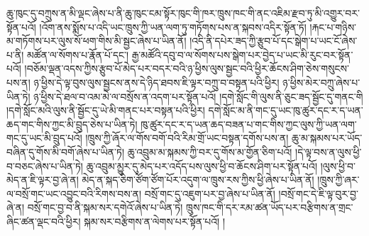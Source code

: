 ཆུ་ཁུང་དུ་བཀྲུས་ན་མི་ལྡང་ཞེས་པ་ནི་ཆུ་ཁུང་ངམ་སྟོར་ཁུང་གི་ཁར་ཁྲུས་ཁང་གི་ནང་འཇིམ་རྫབ་ཏུ་མི་འགྱུར་བར་སྟོན་པའོ། །འོག་ནས་སྨོས་པ་འདི་ཡང་ཁྲུས་ཀྱི་ཡན་ལག་ཏུ་གཏོགས་པས་ན་སྐབས་འདིར་སྟོན་ཏོ། །རྐང་པ་གཉིས་མ་གཏོགས་པར་ལུས་སོ་ཕག་གིས་མི་སྦྱང་ཞེས་པ་ཡིན་ནོ། །འདི་ནི་དཔེར་ཟད་ཀྱི་རྩུབ་པོ་དང་སྒེག་པ་ཡང་ངོ་ཞེས་པ་ནི། མཚོན་ལ་སོགས་པ་རྣོན་པོ་དང་། རྒྱ་མཚོའི་དབུ་བ་ལ་སོགས་པས་སྒེག་པར་བྱེད་པ་ཡང་མི་རུང་བར་སྟོན་པའོ། །བཅོམ་ལྡན་འདས་ཀྱིས་རྩུབ་པོ་མེད་པར་བདར་བའི་ཉ་ཕྱིས་ལུས་སྦྱང་བའི་ཕྱིར་ཆོངས་ཤིག་ཅེས་གསུངས་པས་ན། ཉ་ཕྱིས་དེ་ལྟ་བུས་ལུས་སྦྱངས་ནས་དེ་ཉིད་ཐབས་ཇི་ལྟར་བཀྲུ་བ་བསྟན་པའི་ཕྱིར། ཉ་ཕྱིས་མེར་བཀྲུ་ཞེས་པ་ཡིན་ཏེ། ཉ་ཕྱིས་དེ་ཐལ་བ་འམ་མེ་ལ་བསྲོས་ན་འདག་པར་སྟོན་པའོ། །དགེ་སློང་གི་ལུས་ནི་ཅུང་ཟད་སྦྱོང་དུ་གནང་གི །དགེ་སློང་མའི་ལུས་ནི་སྦྱོང་དུ་ཡེ་མི་གནང་པར་བསྟན་པའི་ཕྱིར། དགེ་སློང་མ་ནི་གང་དུ་ཡང་ཁུ་ཚུར་དང་ར་ད་ཡན་ཆད་གང་གིས་ཀྱང་མི་བྲུད་ཅེས་པ་ཡིན་ཏེ། ཁུ་ཚུར་དང་ར་ད་ཡན་ཆད་བཟན་པ་གང་གིས་ཀྱང་ལུས་ཀྱི་ཡན་ལག་གང་དུ་ཡང་མི་བྲུད་པའོ། །ཁྲུས་ཀྱི་ཞོར་ལ་གོས་བགོ་བའི་རིམ་གྲོ་ཡང་བསྟན་དགོས་པས་ན། ཆུ་མ་སྐམས་པར་ཡོད་བཞིན་དུ་གོས་མི་བགོ་ཞེས་པ་ཡིན་ཏེ། ཆུ་འབྲུམ་མ་སྐམས་ཀྱི་བར་དུ་གོས་མ་གྱོན་ཅིག་པའོ། །དེ་ལྟ་བས་ན་ལུས་ཕྱི་བ་བཅང་ཞེས་པ་ཡིན་ཏེ། ཆུ་འབྲུམ་མྱུར་དུ་མེད་པར་འདོད་པས་ལུས་ཕྱི་བ་ཆོངས་ཤིག་པར་སྟོན་པའོ། །ལུས་ཕྱི་བ་མེད་ན་ཇི་ལྟར་བྱ་ཞེ་ན། མེད་ན་སྐད་ཅིག་ཙོག་ཙོག་པོར་འདུག་ལ་ཁྲུས་རས་ཀྱིས་ཕྱི་ཞེས་པ་ཡིན་ནོ། །ཁྲུས་ཀྱི་ཞར་ལ་བསྲོ་གང་ཡང་འབྱུང་བའི་རིགས་བས་ན། བསྲོ་གང་དུ་འཇུག་པར་བྱ་ཞེས་པ་ཡིན་ནོ། །བསྲོ་གང་དེ་ཇི་ལྟ་བུར་བྱ་ཞེ་ན། བསྲོ་གང་བྱ་བ་ནི་སྐམ་སར་དགེའོ་ཞེས་པ་ཡིན་ཏེ། ཁྲུས་ཁང་གི་དར་རམ་ཚན་ཡོད་པར་བརྩིགས་ན་གྲང་ཞིང་ཚན་ལྡང་བའི་ཕྱིར། སྐམ་སར་བརྩིགས་ན་ལེགས་པར་སྟོན་པའོ། །

